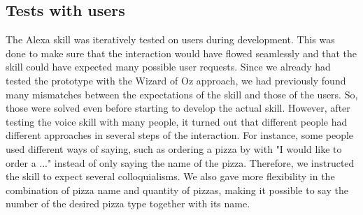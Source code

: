 \subsection{Tests with users}

The Alexa skill was iteratively tested on users during development. This was done to make
sure that the interaction would have flowed seamlessly and that the skill could have
expected many possible user requests. Since we already had tested the prototype with the
Wizard of Oz approach, we had previously found many mismatches between the expectations
of the skill and those of the users. So, those were solved even before starting to develop
the actual skill. However, after testing the voice skill with many people, it turned out
that different people had different approaches in several steps of the interaction. For
instance, some people used different ways of saying, such as ordering a pizza by
with "I would like to order a ..." instead of only saying the name of the pizza.
Therefore, we instructed the skill to expect several colloquialisms. We also gave more
flexibility in the combination of pizza name and quantity of pizzas, making it possible
to say the number of the desired pizza type together with its name.